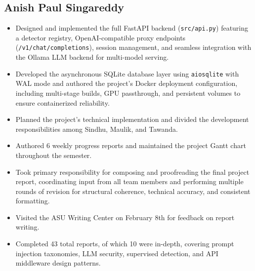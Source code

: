 \documentclass[12pt, letterpaper]{article}   %
\begin{document}
\subsection{Anish Paul Singareddy}
\begin{itemize}
    \item Designed and implemented the full FastAPI backend (\texttt{src/api.py}) featuring a detector registry, OpenAI-compatible proxy endpoints (\texttt{/v1/chat/completions}), session management, and seamless integration with the Ollama LLM backend for multi-model serving.
    \item Developed the asynchronous SQLite database layer using \texttt{aiosqlite} with WAL mode and authored the project's Docker deployment configuration, including multi-stage builds, GPU passthrough, and persistent volumes to ensure containerized reliability.
    \item Planned the project's technical implementation and divided the development responsibilities among Sindhu, Maulik, and Tawanda.
    \item Authored 6 weekly progress reports and maintained the project Gantt chart throughout the semester.
    \item Took primary responsibility for composing and proofreading the final project report, coordinating input from all team members and performing multiple rounds of revision for structural coherence, technical accuracy, and consistent formatting.
    \item Visited the ASU Writing Center on February 8th for feedback on report writing.
    \item Completed 43 total reports, of which 10 were in-depth, covering prompt injection taxonomies, LLM security, supervised detection, and API middleware design patterns.
\end{itemize}
\end{document}
